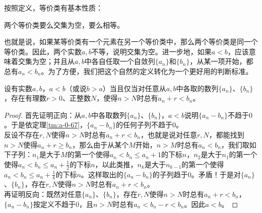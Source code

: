 \documentclass[12pt,UTF8,fontset=none]{ctexbook}
\begin{document}
\begin{appendix}
按照定义，等价类有基本性质：
\begin{tm}\label{lm:a-1-10}
    两个等价类要么交集为空，要么相等。    
\end{tm}
也就是说，如果某等价类有一个元素在另一个等价类中，那么两个等价类是同一个等价类。因此，两个实数$a,b$不等，说明交集为空。进一步地，如果$a<b$，应该意味着交集为空；并且从$a,b$中各自任取一个自敛列$\{a_n\}$和$\{b_n\}$，从某一项开始，都总有$a_n < b_n$。为了方便，我们把这个自然的定义转化为一个更好用的判断标准。
\begin{tm}\label{tm:a-1-12}
    设有实数$a,b$，$a<b$（或说$b>a$）当且仅当对任意从$a,b$中各取的数列$\{a_n\}$、$\{b_n\}$，存在有理数$r>0$、正整数$N$，使得$n>N$时总有$a_n+r<b_n$。
\end{tm}
\begin{proof}
    首先证明正向：从$a,b$中各取数列$\{a_n\}$、$\{b_n\}$，$a<b$说明$\{a_n - b_n\}$不趋于$0$。于是依定理\ref{tm:a-0-67}，$\{a_n - b_n\}$的任何子列不趋于$0$。\\
    反设不存在$r,N$使得$n>N$时总有$a_n+r<b_n$，也就是说对任意$r,N$，都能找到$n>N$使得$a_n+r\geqslant b_n$，那么由于从某个$M$开始，$n>M$时总有$a_n < b_n$，我们取如下子列：$n_1$是大于$M$的第一个使得$a_n<b_n\leqslant a_n+1$的下标$n$，$n_2$是大于$n_1$的第一个使得$a_n<b_n\leqslant a_n+\frac{1}{2}$的下标$n$，以此类推，$n_k$是大于$n_{k-1}$的第一个使得$a_n<b_n\leqslant a_n+\frac{1}{k}$的下标$n$。这样取出的$\{a_n - b_n\}$的子列趋于$0$。矛盾！于是对$\{a_n\}$、$\{b_n\}$，存在$r,N$使得$n>N$时总有$a_n+r<b_n$。\\
    再证明反向：既然对任意$\{a_n\}$、$\{b_n\}$，存在$r,N$使得$n>N$时总有$a_n+r<b_n$，$\{a_n - b_n\}$按定义不趋于$0$，且$n>N$时总有$a_n<b_n-r<b_n$。因此$a<b$。
\end{proof}


\end{appendix}
\end{document}
